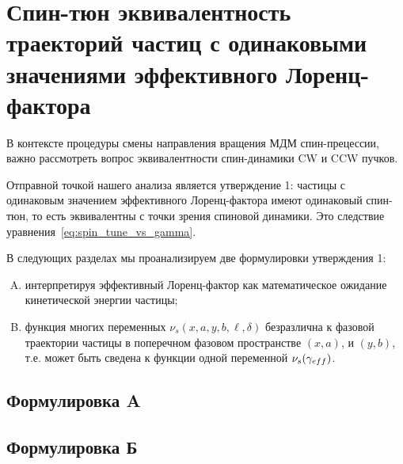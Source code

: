

\section{Спин-тюн эквивалентность траекторий частиц с одинаковыми значениями эффективного Лоренц-фактора}\label{sec:spin_tune_traj_equivalence}
В контексте процедуры смены направления вращения МДМ спин-прецессии, важно рассмотреть 
вопрос эквивалентности спин-динамики CW и CCW пучков. 

Отправной точкой нашего анализа является утверждение 1: частицы с одинаковым значением эффективного Лоренц-фактора имеют одинаковый спин-тюн, то есть эквивалентны с точки зрения спиновой динамики. Это следствие уравнения~\eqref{eq:spin_tune_vs_gamma}.

В следующих разделах мы проанализируем две формулировки утверждения 1:
\begin{enumerate}[A.]
	\item интерпретируя эффективный Лоренц-фактор как математическое ожидание кинетической энергии частицы;
	\item функция многих переменных $\nu_s(x, a, y, b, \ell, \delta)$ безразлична к фазовой траектории частицы 
	в поперечном фазовом пространстве $(x,a)$, и $(y,b)$, т.е. может быть сведена 
	к функции одной переменной $\nu_s(\g*)$.
\end{enumerate}

\subsection{Формулировка A}


\subsection{Формулировка Б}\label{sec:spin_stune_traj_equ:B_form}


\clearpage
